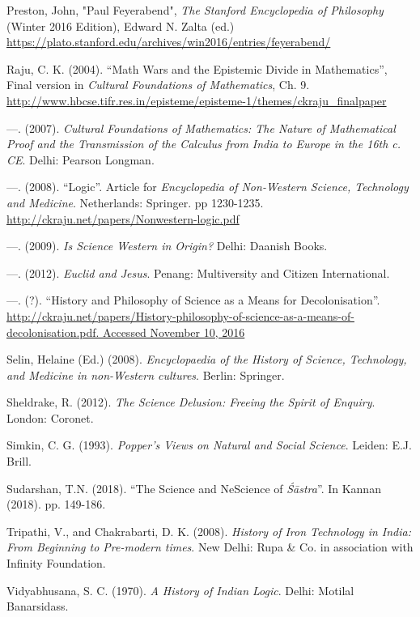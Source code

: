 \begin{thebibliography}{99}
  Preston, John, "Paul Feyerabend", \textit{The Stanford Encyclopedia of Philosophy} (Winter 2016 Edition), Edward N. Zalta (ed.) \url{https://plato.stanford.edu/archives/win2016/entries/feyerabend/}
 
  Raju, C. K. (2004). “Math Wars and the Epistemic Divide in Mathematics”, Final version in \textit{Cultural Foundations of Mathematics}, Ch. 9. \url{http://www.hbcse.tifr.res.in/episteme/episteme-1/themes/ckraju_finalpaper}

  ---. (2007). \textit{Cultural Foundations of Mathematics: The Nature of Mathematical Proof and the Transmission of the Calculus from India to Europe in the 16th c. CE}. Delhi: Pearson Longman.

  ---. (2008). “Logic”. Article for \textit{Encyclopedia of Non-Western Science, Technology and Medicine}. Netherlands: Springer. pp 1230-1235. \url{http://ckraju.net/papers/Nonwestern-logic.pdf}

  ---. (2009). \textit{Is Science Western in Origin?} Delhi: Daanish Books.

  ---. (2012). \textit{Euclid and Jesus}. Penang: Multiversity and Citizen International.

  ---. (?). “History and Philosophy of Science as a Means for Decolonisation”. \url{http://ckraju.net/papers/History-philosophy-of-science-as-a-means-of-decolonisation.pdf. Accessed November 10, 2016}

  Selin, Helaine (Ed.) (2008). \textit{Encyclopaedia of the History of Science, Technology, and Medicine in non-Western cultures}. Berlin: Springer.

  Sheldrake, R. (2012). \textit{The Science Delusion: Freeing the Spirit of Enquiry}. London: Coronet.

  Simkin, C. G. (1993). \textit{Popper's Views on Natural and Social Science}. Leiden: E.J. Brill.

  Sudarshan, T.N. (2018). “The Science and NeScience of \textit{Śāstra}”. In Kannan (2018). pp. 149-186.

  Tripathi, V., and Chakrabarti, D. K. (2008). \textit{History of Iron Technology in India: From Beginning to Pre-modern times}. New Delhi: Rupa \& Co. in association with Infinity Foundation.

  Vidyabhusana, S. C. (1970). \textit{A History of Indian Logic}. Delhi: Motilal Banarsidass.

 \end{thebibliography}

\theendnotes

